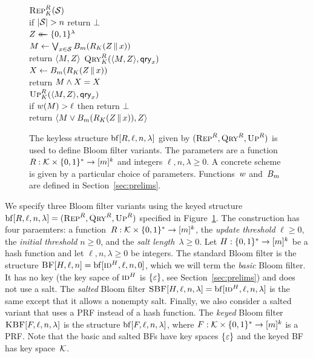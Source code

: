 \begin{figure}
  {
    \underline{$\textnormal{\textsc{Rep}}^R_K(\mathcal{S})$}\\[2pt]
      if $|\mathcal{S}| > n$ return $\bot$\\
      $Z \mathrel{\leftarrow\mkern-14mu\leftarrow} \{0,1\}^\lambda$\\
      $M \gets \bigvee_{x \in \mathcal{S}} {B}_m(R_K(Z \, \| \, x))$\\
      return $\langle M, Z \rangle$
  }
  {
    \underline{$\textnormal{\textsc{Qry}}^R_K(\langle M, Z \rangle,\mathsf{qry}_x)$}\\[2pt]
      $X \gets {B}_m(R_K(Z \, \| \, x))$\\
      return $M \wedge X = X$
    \\[6pt]
    \underline{$\textnormal{\textsc{Up}}^R_K(\langle M, Z \rangle,\mathsf{qry}_x)$}\\[2pt]
      if ${w}(M) > \ell$ then return $\bot$\\
      return $\langle M \vee {B}_m(R_K(Z \, \| \, x)), Z \rangle$
  }
  \caption{The keyless structure $\mathrm{bf}[R,\ell,n,\lambda]$ given by
  $(\textnormal{\textsc{Rep}}^R,\textnormal{\textsc{Qry}}^R,\textnormal{\textsc{Up}}^R)$ is used to define Bloom filter variants. The
  parameters are a function $R: \mathcal{K}\times\{0,1\}^* \to [m]^k$ and integers $\ell, n,
  \lambda \geq0$. A concrete scheme is given by a particular choice of
  parameters.  Functions~${w}$ and~${B}_m$ are defined in
  Section~\ref{sec:prelims}.
  }
  \label{fig:bf-def}
\end{figure}


\medskip
We specify three Bloom filter variants using the keyed structure
$\mathrm{bf}[R,\ell,n,\lambda] = (\textnormal{\textsc{Rep}}^R,\textnormal{\textsc{Qry}}^R,\textnormal{\textsc{Up}}^R)$ specified in
Figure~\ref{fig:bf-def}.
%
The construction has four paraemters: a function~$R:\mathcal{K}\times\{0,1\}^*\to[m]^k$, the
\emph{update threshold} $\ell\geq0$, the \emph{initial threshold} $n\geq0$, and
the \emph{salt length}~$\lambda\geq0$.
%
Let $H:\{0,1\}^*\to[m]^k$ be a hash function and let $\ell, n, \lambda\geq0$ be
integers.
%
The standard Bloom filter is the structure $\textnormal{\textsc{BF}}[H,\ell,n] =
\mathrm{bf}[\textnormal{\textsc{id}}^H,\ell,n,0]$, which we will term the \emph{basic} Bloom filter. It
has no key (the key sapce of $\textnormal{\textsc{id}}^H$ is $\{\varepsilon\}$, see
Section~\ref{sec:prelims}) and does not use a salt.
%
The \emph{salted} Bloom filter $\textnormal{\textsc{SBF}}[H,\ell,n,\lambda] =
\mathrm{bf}[\textnormal{\textsc{id}}^H,\ell,n,\lambda]$ is the same except that it allows a nonempty salt.
%
Finally, we also consider a salted variant that uses a PRF instead of a hash
function. The \emph{keyed} Bloom filter $\textnormal{\textsc{KBF}}[F,\ell,n,\lambda]$ is the
structure $\mathrm{bf}[F,\ell,n,\lambda]$, where $F:\mathcal{K}\times\{0,1\}^*\to[m]^k$ is a
PRF.
%
Note that the basic and salted BFs have key spaces $\{\varepsilon\}$ and the keyed
BF has key space~$\mathcal{K}$.

